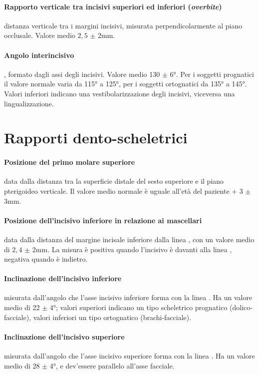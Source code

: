 \paragraph{Rapporto verticale tra incisivi superiori ed inferiori (\textit{overbite})} distanza verticale tra i margini incisivi, misurata perpendicolarmente al piano occlusale. Valore medio $2,5$ $\pm$ 2mm.

\paragraph{Angolo interincisivo}, formato dagli assi degli incisivi. Valore medio 130 $\pm$ 6°. Per i soggetti prognatici il valore normale varia da 115° a 125°, per i soggetti ortognatici da 135° a 145°. Valori inferiori indicano una vestibolarizzazione degli incisivi, viceversa una lingualizzazione.

\section{Rapporti dento-scheletrici}

\paragraph{Posizione del primo molare superiore} data dalla distanza tra la superficie distale del sesto superiore e il piano pterigoideo verticale. Il valore medio normale è uguale all'età del paziente $+$ 3 $\pm$ 3mm.

\paragraph{Posizione dell'incisivo inferiore in relazione ai mascellari} data dalla distanza del margine incisale inferiore dalla linea , con un valore medio di $2,4$ $\pm$ 2mm. La misura è positiva quando l'incisivo è davanti alla linea , negativa quando è indietro.

\paragraph{Inclinazione dell'incisivo inferiore} misurata dall'angolo che l'asse incisivo inferiore forma con la linea . Ha un valore medio di 22 $\pm$ 4°; valori superiori indicano un tipo scheletrico prognatico (dolico-facciale), valori inferiori un tipo ortognatico (brachi-facciale).

\paragraph{Inclinazione dell'incisivo superiore} misurata dall'angolo che l'asse incisivo superiore forma con la linea . Ha un valore medio di 28 $\pm$ 4°, e dev'essere parallelo all'asse facciale.

